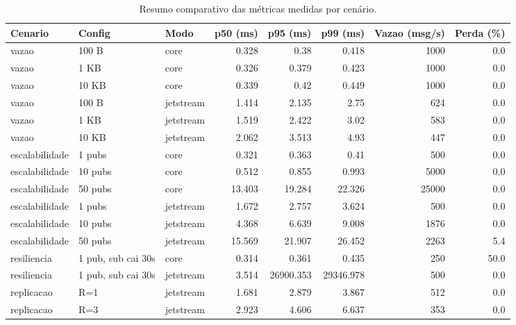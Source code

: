 \begin{table}[h]
\centering
\caption{Resumo comparativo das métricas medidas por cenário.}
\label{tab:resumo}
\begin{tabular}{lllrrrrr}
\toprule
Cenario & Config & Modo & p50 (ms) & p95 (ms) & p99 (ms) & Vazao (msg/s) & Perda (\%) \\
\midrule
vazao & 100 B & core & 0.328 & 0.38 & 0.418 & 1000 & 0.0 \\
vazao & 1 KB & core & 0.326 & 0.379 & 0.423 & 1000 & 0.0 \\
vazao & 10 KB & core & 0.339 & 0.42 & 0.449 & 1000 & 0.0 \\
vazao & 100 B & jetstream & 1.414 & 2.135 & 2.75 & 624 & 0.0 \\
vazao & 1 KB & jetstream & 1.519 & 2.422 & 3.02 & 583 & 0.0 \\
vazao & 10 KB & jetstream & 2.062 & 3.513 & 4.93 & 447 & 0.0 \\
escalabilidade & 1 pubs & core & 0.321 & 0.363 & 0.41 & 500 & 0.0 \\
escalabilidade & 10 pubs & core & 0.512 & 0.855 & 0.993 & 5000 & 0.0 \\
escalabilidade & 50 pubs & core & 13.403 & 19.284 & 22.326 & 25000 & 0.0 \\
escalabilidade & 1 pubs & jetstream & 1.672 & 2.757 & 3.624 & 500 & 0.0 \\
escalabilidade & 10 pubs & jetstream & 4.368 & 6.639 & 9.008 & 1876 & 0.0 \\
escalabilidade & 50 pubs & jetstream & 15.569 & 21.907 & 26.452 & 2263 & 5.4 \\
resiliencia & 1 pub, sub cai 30s & core & 0.314 & 0.361 & 0.435 & 250 & 50.0 \\
resiliencia & 1 pub, sub cai 30s & jetstream & 3.514 & 26900.353 & 29346.978 & 500 & 0.0 \\
replicacao & R=1 & jetstream & 1.681 & 2.879 & 3.867 & 512 & 0.0 \\
replicacao & R=3 & jetstream & 2.923 & 4.606 & 6.637 & 353 & 0.0 \\
\bottomrule
\end{tabular}
\end{table}

